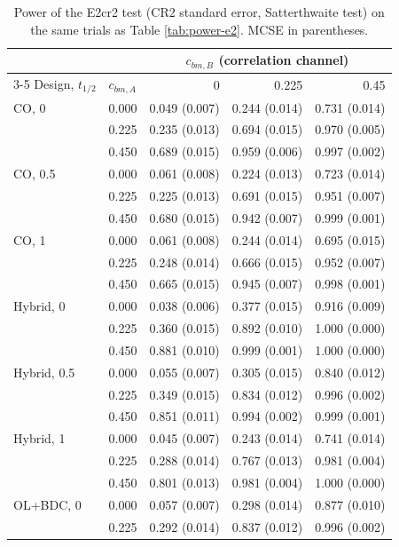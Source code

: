 \documentclass[
  11pt,
]{article}
\begin{document}
\begin{table}[H]
\small\centering
\caption{Power of the E2cr2 test (CR2 standard error, Satterthwaite test) on the same trials as Table \ref{tab:power-e2}. MCSE in parentheses.}
\label{tab:power-cr2}
\begin{tabular}{llrrr}
\toprule
& & \multicolumn{3}{c}{$c_{bm,B}$ (correlation channel)} \\
\cmidrule(l){3-5}
Design, $t_{1/2}$ & $c_{bm,A}$ & 0 & 0.225 & 0.45 \\
\midrule
CO, 0 & 0.000 & 0.049 (0.007) & 0.244 (0.014) & 0.731 (0.014) \\
 & 0.225 & 0.235 (0.013) & 0.694 (0.015) & 0.970 (0.005) \\
 & 0.450 & 0.689 (0.015) & 0.959 (0.006) & 0.997 (0.002) \\
\addlinespace
CO, 0.5 & 0.000 & 0.061 (0.008) & 0.224 (0.013) & 0.723 (0.014) \\
 & 0.225 & 0.225 (0.013) & 0.691 (0.015) & 0.951 (0.007) \\
 & 0.450 & 0.680 (0.015) & 0.942 (0.007) & 0.999 (0.001) \\
\addlinespace
CO, 1 & 0.000 & 0.061 (0.008) & 0.244 (0.014) & 0.695 (0.015) \\
 & 0.225 & 0.248 (0.014) & 0.666 (0.015) & 0.952 (0.007) \\
 & 0.450 & 0.665 (0.015) & 0.945 (0.007) & 0.998 (0.001) \\
\addlinespace
Hybrid, 0 & 0.000 & 0.038 (0.006) & 0.377 (0.015) & 0.916 (0.009) \\
 & 0.225 & 0.360 (0.015) & 0.892 (0.010) & 1.000 (0.000) \\
 & 0.450 & 0.881 (0.010) & 0.999 (0.001) & 1.000 (0.000) \\
\addlinespace
Hybrid, 0.5 & 0.000 & 0.055 (0.007) & 0.305 (0.015) & 0.840 (0.012) \\
 & 0.225 & 0.349 (0.015) & 0.834 (0.012) & 0.996 (0.002) \\
 & 0.450 & 0.851 (0.011) & 0.994 (0.002) & 0.999 (0.001) \\
\addlinespace
Hybrid, 1 & 0.000 & 0.045 (0.007) & 0.243 (0.014) & 0.741 (0.014) \\
 & 0.225 & 0.288 (0.014) & 0.767 (0.013) & 0.981 (0.004) \\
 & 0.450 & 0.801 (0.013) & 0.981 (0.004) & 1.000 (0.000) \\
\addlinespace
OL+BDC, 0 & 0.000 & 0.057 (0.007) & 0.298 (0.014) & 0.877 (0.010) \\
 & 0.225 & 0.292 (0.014) & 0.837 (0.012) & 0.996 (0.002) \\

\end{tabular}
\end{table}
\end{document}
